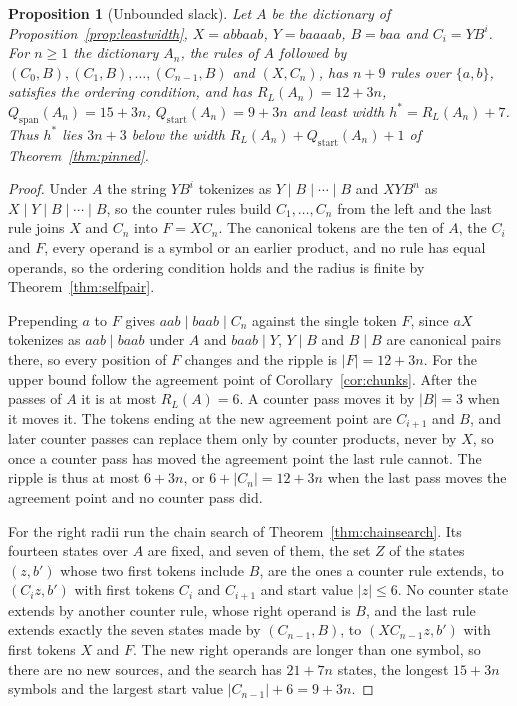 \documentclass[11pt,a4paper]{article}
\theoremstyle{definition}
\theoremstyle{plain}
\newtheorem{proposition}{Proposition}
\newcommand{\ripple}{R_{L}}
\begin{document}
\begin{proposition}[Unbounded slack]\label{prop:slack}
Let \(A\) be the dictionary of Proposition~\ref{prop:leastwidth}, \(X = abbaab\), \(Y = baaaab\), \(B = baa\) and
\(C_i = Y B^i\). For \(n \ge 1\) the dictionary \(A_n\), the rules of \(A\) followed by
\((C_0, B), (C_1, B), \dots, (C_{n-1}, B)\) and \((X, C_n)\), has \(n + 9\) rules over \(\{a, b\}\), satisfies the
ordering condition, and has \(\ripple(A_n) = 12 + 3n\), \(Q_{\mathrm{span}}(A_n) = 15 + 3n\),
\(Q_{\mathrm{start}}(A_n) = 9 + 3n\) and least width \(h^* = \ripple(A_n) + 7\). Thus \(h^*\) lies \(3n + 3\) below the
width \(\ripple(A_n) + Q_{\mathrm{start}}(A_n) + 1\) of Theorem~\ref{thm:pinned}.
\end{proposition}

\begin{proof}
Under \(A\) the string \(Y B^i\) tokenizes as \(Y \mid B \mid \cdots \mid B\) and \(X Y B^n\) as
\(X \mid Y \mid B \mid \cdots \mid B\), so the counter rules build \(C_1, \dots, C_n\) from the left and the last rule
joins \(X\) and \(C_n\) into \(F = X C_n\). The canonical tokens are the ten of \(A\), the \(C_i\) and \(F\), every
operand is a symbol or an earlier product, and no rule has equal operands, so the ordering condition holds and the
radius is finite by Theorem~\ref{thm:selfpair}.

Prepending \(a\) to \(F\) gives \(aab \mid baab \mid C_n\) against the single token \(F\), since \(a X\) tokenizes as
\(aab \mid baab\) under \(A\) and \(baab \mid Y\), \(Y \mid B\) and \(B \mid B\) are canonical pairs there, so every
position of \(F\) changes and the ripple is \(|F| = 12 + 3n\). For the upper bound follow the agreement point of
Corollary~\ref{cor:chunks}. After the passes of \(A\) it is at most \(\ripple(A) = 6\). A counter pass moves it by
\(|B| = 3\) when it moves it. The tokens ending at the new agreement point are \(C_{i+1}\) and \(B\), and later counter
passes can replace them only by counter products, never by \(X\), so once a counter pass has moved the agreement point
the last rule cannot. The ripple is thus at most \(6 + 3n\), or \(6 + |C_n| = 12 + 3n\) when the last pass moves the
agreement point and no counter pass did.

For the right radii run the chain search of Theorem~\ref{thm:chainsearch}. Its fourteen states over \(A\) are fixed, and
seven of them, the set \(Z\) of the states \((z, b')\) whose two first tokens include \(B\), are the ones a counter rule
extends, to \((C_i z, b')\) with first tokens \(C_i\) and \(C_{i+1}\) and start value \(|z| \le 6\). No counter state
extends by another counter rule, whose right operand is \(B\), and the last rule extends exactly the seven states made
by \((C_{n-1}, B)\), to \((X C_{n-1} z, b')\) with first tokens \(X\) and \(F\). The new right operands are longer than
one symbol, so there are no new sources, and the search has \(21 + 7n\) states, the longest \(15 + 3n\) symbols and the
largest start value \(|C_{n-1}| + 6 = 9 + 3n\).


\end{proof}
\end{document}
